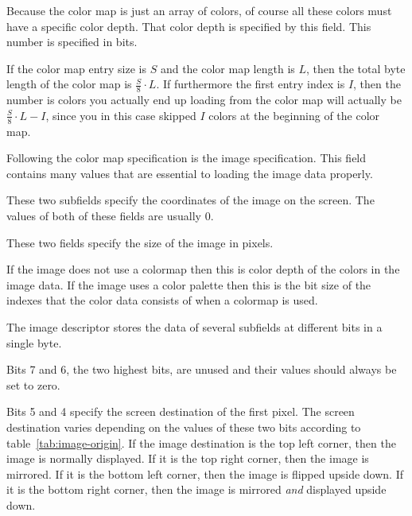 Because the color map is just an array of colors, of course all
these colors must have a specific color depth. That color depth is
specified by this field. This number is specified in bits.

If the color map entry size is $S$ and the color map length is $L$,
then the total byte length of the color map is $\frac{S}{8} \cdot
L$. If furthermore the first entry index is $I$, then the number is
colors you actually end up loading from the color map will actually be
$\frac{S}{8} \cdot L - I$, since you in this case skipped $I$ colors
at the beginning of the color map.


Following the color map specification is the image specification. This
field contains many values that are essential to loading the image data
properly.



These two subfields specify the coordinates of the image on the
screen. The values of both of these fields are usually $0$.



These two fields specify the size of the image in pixels.


If the image does not use a colormap then this is color depth of the
colors in the image data. If the image uses a color palette then this
is the bit size of the indexes that the color data consists of when a
colormap is used.


The image descriptor stores the data of several subfields at different
bits in a single byte.

Bits 7 and 6, the two highest bits, are unused and their values should
always be set to zero.

Bits 5 and 4 specify the screen destination of the first pixel. The
screen destination varies depending on the values of these two bits
according to table~\ref{tab:image-origin}. If the image destination is
the top left corner, then the image is normally displayed. If it is
the top right corner, then the image is mirrored. If it is the bottom
left corner, then the image is flipped upside down. If it is the
bottom right corner, then the image is mirrored \textit{and} displayed
upside down.

